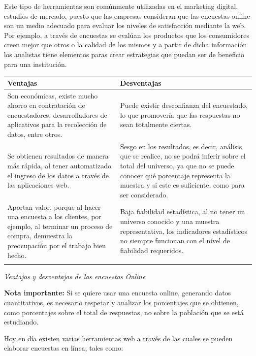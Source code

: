 \documentclass[a5paper,doc,10pt,noapacite]{apa6}
\begin{document}
{{Este tipo de herramientas son comúnmente utilizadas en el marketing digital, estudios de mercado, puesto que las empresas consideran que las encuestas online son un medio adecuado para evaluar los niveles de satisfacción mediante la web. Por ejemplo, a través de encuestas se evalúan los productos que los consumidores creen mejor que otros o la calidad de los mismos y a partir de dicha información los analistas tiene elementos paras crear estrategias que puedan ser de beneficio para una institución.


	\begin{center}
	\fontsize{7}{11}\selectfont
	\begin{tabularx}{\textwidth}{X X}
		\thickline
		\textbf{Ventajas} & \textbf{Desventajas} \\	\hline
Son económicas, existe mucho ahorro en contratación de encuestadores, desarrolladores de aplicativos para la recolección de datos, entre otros. & Puede existir desconfianza del encuestado, lo que promovería que las respuestas no sean totalmente ciertas. \\
Se obtienen resultados de manera más rápida, al tener automatizado el ingreso de los datos a través de las aplicaciones web. & Sesgo en los resultados, es decir, análisis que se realice, no se podrá inferir sobre el total del universo, ya que no se puede conocer qué porcentaje representa la muestra y si este es suficiente, como para ser considerado.\\
    Aportan valor, porque al hacer una encuesta a los clientes, por ejemplo, al terminar un proceso de compra, demuestra la preocupación por el trabajo bien hecho. & Baja fiabilidad estadística, al no tener un universo conocido y una muestra representativa, los indicadores estadísticos no siempre funcionan con el nivel de fiabilidad requeridos. \\
		\thickline
		\\[3em]
	\end{tabularx}
	\label{tab:B1}

	\emph{Ventajas y desventajas de las encuestas Online}
	\end{center}


\textbf{Nota importante:} Si se quiere usar una encuesta online, generando datos cuantitativos, es necesario respetar y analizar los porcentajes que se obtienen, como porcentajes sobre el total de respuestas, no sobre la población que se está estudiando.

\vspace{1\baselineskip}
Hoy en día existen varias herramientas web a través de las cuales se pueden elaborar encuestas en línea, tales como:

}}
\end{document}
